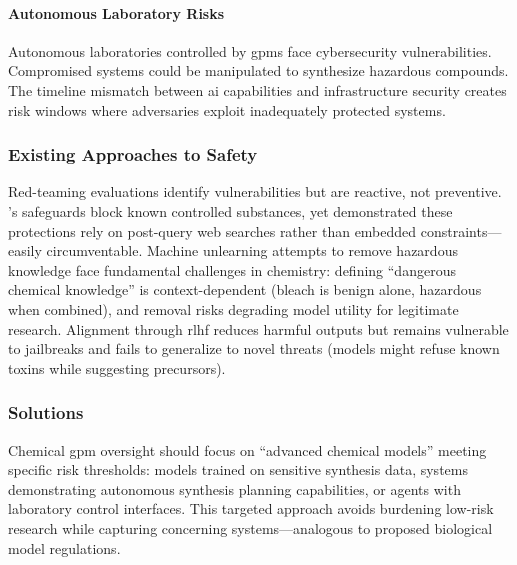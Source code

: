 \paragraph{Autonomous Laboratory Risks} 
Autonomous laboratories controlled by \glspl{gpm} face cybersecurity vulnerabilities. Compromised systems could be manipulated to synthesize hazardous compounds. The timeline mismatch between \gls{ai} capabilities and infrastructure security creates risk windows where adversaries exploit inadequately protected systems.\autocite{rouleau2025risks, dean2025security}


\subsubsection{Existing Approaches to Safety} Red-teaming evaluations identify vulnerabilities but are reactive, not preventive. 's safeguards block known controlled substances, yet \textcite{he2023control} demonstrated these protections rely on post-query web searches rather than embedded constraints---easily circumventable. Machine unlearning attempts to remove hazardous knowledge face fundamental challenges in chemistry: defining \enquote{dangerous chemical knowledge} is context-dependent (bleach is benign alone, hazardous when combined), and removal risks degrading model utility for legitimate research. Alignment through \gls{rlhf} reduces harmful outputs but remains vulnerable to jailbreaks\autocite{kuntz2025os-harm, yona2024stealing, lynch2025agentic} and fails to generalize to novel threats (models might refuse known toxins while suggesting precursors).


\subsubsection{Solutions}

Chemical \gls{gpm} oversight should focus on \enquote{advanced chemical models} meeting specific risk thresholds: models trained on sensitive synthesis data, systems demonstrating autonomous synthesis planning capabilities, or agents with laboratory control interfaces. This targeted approach avoids burdening low-risk research while capturing concerning systems---analogous to proposed biological model regulations.\autocite{bloomfield2024ai}

